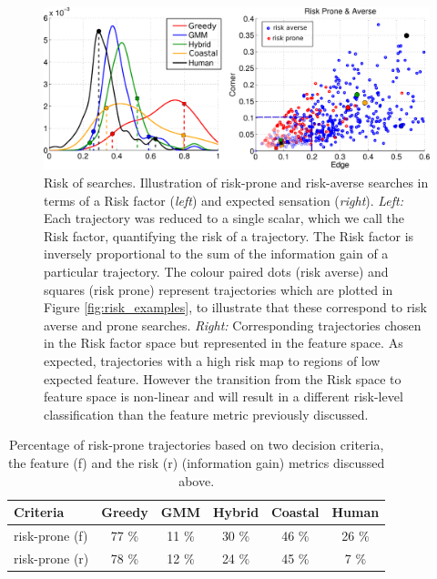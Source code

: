 \begin{figure}
  \centering
  \includegraphics[width=\textwidth]{./ch3-Search/Figures/Figure7} 
 \caption{Risk of searches. Illustration of risk-prone and risk-averse searches in terms of a Risk factor (\textit{left}) and expected sensation (\textit{right}).
 \textit{Left:} Each trajectory was reduced to a single scalar, which we call the Risk factor, quantifying the risk of a trajectory. The Risk factor 
 is inversely proportional to the sum of the information gain of a particular trajectory. The colour paired dots (risk averse) and squares (risk prone) 
 represent trajectories which are plotted in 
 Figure \ref{fig:risk_examples}, to illustrate that these correspond to risk averse and prone searches.
 \textit{Right:} Corresponding trajectories chosen in the Risk factor space but represented in the feature space. As expected, trajectories with
 a high risk map to regions of low expected feature. However the transition from the Risk space to feature space is non-linear and will result in a different
 risk-level classification than the feature metric previously discussed.}
 \label{fig:riskexamples}
\end{figure}



\begin{table}
\centering
\begin{minipage}{\textwidth}
\centering
 \begin{tabular}{|l|c|c|c|c|c|}
 \cline{1-6}
   Criteria        &  \textbf{Greedy} & \textbf{GMM}  & \textbf{Hybrid} & \textbf{Coastal} & \textbf{Human} \\ \hline
  risk-prone (f) &   77 \% & 11 \% &  30 \% & 46 \% & 26  \% \\ \hline
  risk-prone (r) &   78 \% & 12 \% &  24 \% & 45 \% &  7 \% \\ \hline
 \end{tabular}
\end{minipage}
 \caption{Percentage of risk-prone trajectories based on two decision criteria, the feature (f) and the risk (r) (information gain) metrics discussed above.}
 \label{tab:percentage-risk-prone}
\end{table}

